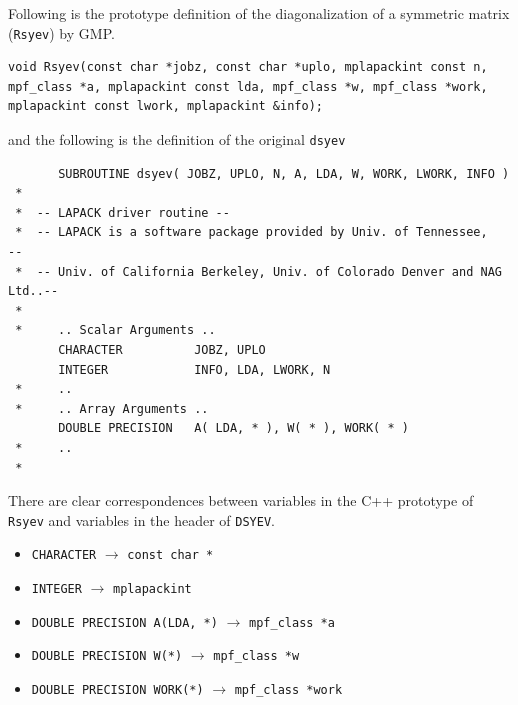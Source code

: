 \documentclass[12pt]{article}
\begin{document}
Following is the prototype definition of the diagonalization of a symmetric matrix ({\tt Rsyev}) by GMP.
\begin{verbatim}
void Rsyev(const char *jobz, const char *uplo, mplapackint const n, 
mpf_class *a, mplapackint const lda, mpf_class *w, mpf_class *work, 
mplapackint const lwork, mplapackint &info);
\end{verbatim}
and the following is the definition of the original {\tt dsyev} 
\begin{verbatim}
       SUBROUTINE dsyev( JOBZ, UPLO, N, A, LDA, W, WORK, LWORK, INFO )
 *
 *  -- LAPACK driver routine --
 *  -- LAPACK is a software package provided by Univ. of Tennessee,    --
 *  -- Univ. of California Berkeley, Univ. of Colorado Denver and NAG Ltd..--
 *
 *     .. Scalar Arguments ..
       CHARACTER          JOBZ, UPLO
       INTEGER            INFO, LDA, LWORK, N
 *     ..
 *     .. Array Arguments ..
       DOUBLE PRECISION   A( LDA, * ), W( * ), WORK( * )
 *     ..
 *
\end{verbatim}
There are clear correspondences between variables in the C++ prototype of {\tt Rsyev} and variables in the header of {\tt DSYEV}.
\begin{itemize}
    \item {\tt CHARACTER} $\rightarrow$ {\tt const char *}
    \item {\tt INTEGER} $\rightarrow$ {\tt mplapackint}
    \item {\tt DOUBLE PRECISION A(LDA, *)} $\rightarrow$ {\tt mpf\_class *a}
    \item {\tt DOUBLE PRECISION W(*)} $\rightarrow$ {\tt mpf\_class *w}
    \item {\tt DOUBLE PRECISION WORK(*)} $\rightarrow$ {\tt mpf\_class *work}
\end{itemize}
\end{document}
